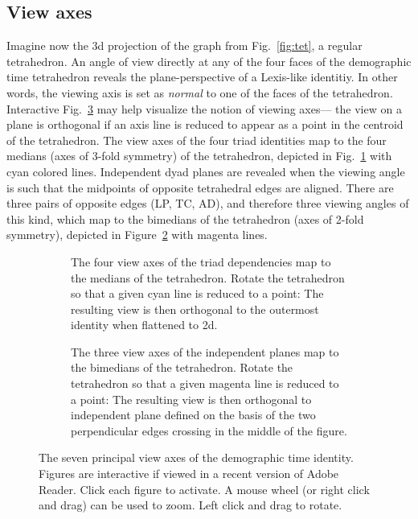 \subsection{View axes}
\label{sec:viewaxes}
Imagine now the 3d projection of the graph from Fig.~\ref{fig:tet}, a regular tetrahedron. An angle of view directly at any of the four faces of the demographic time tetrahedron reveals the plane-perspective of a Lexis-like identitiy. In other words, the viewing axis is set as \emph{normal} to one of the faces of the tetrahedron. Interactive Fig.~\ref{fig:viewaxes} may help visualize the notion of viewing axes--- the view on a plane is orthogonal if an axis line is reduced to appear as a point in the centroid of the tetrahedron. The view axes of the four triad identities map to the four medians (axes of 3-fold symmetry) of the tetrahedron, depicted in
Fig.~\ref{fig:depviewaxes} with cyan colored lines. Independent dyad planes are revealed when the viewing angle is such that the midpoints of opposite tetrahedral edges are aligned. There are three pairs of opposite edges (LP, TC, AD), and therefore three viewing angles of this kind, which map to the bimedians of the tetrahedron (axes of 2-fold symmetry), depicted in Figure~\ref{fig:indepviewaxes} with magenta lines.
\begin{figure}
\begin{subfigure}[t]{0.45\linewidth}
    \centering
    
    \caption{The four view axes of the triad dependencies map to the medians of the tetrahedron. Rotate the tetrahedron so that a given cyan line is reduced to a point: The resulting view is then orthogonal to the outermost identity when flattened to 2d.}
    \label{fig:depviewaxes}
\end{subfigure}
\begin{subfigure}[t]{0.45\linewidth}
    
    \caption{The three view axes of the independent planes map to the bimedians of the tetrahedron. Rotate the tetrahedron so that a given magenta line is reduced to a point: The resulting view is then orthogonal to independent plane defined on the basis of the two perpendicular edges crossing in the middle of the figure.}
    \label{fig:indepviewaxes}       
\end{subfigure}
\caption{The seven principal view axes of the demographic time identity. Figures are interactive if viewed in a recent version of Adobe Reader. Click each figure to activate. A mouse wheel (or right click and drag) can be used to zoom. Left click and drag to rotate.}
\label{fig:viewaxes}
\end{figure}

